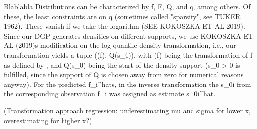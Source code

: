 Blablabla
Distributions can be characterized by f, F, Q, and q, among others. Of these, the least 
constraints are on q (sometimes called "sparsity", see TUKER 1962). These vanish if we
take the logarithm (SEE KOKOSZKA ET AL 2019). Since our DGP generates densities on
different supports, we use KOKOSZKA ET AL (2019)s modification on the log quantile-density
transformation, i.e., our transformation yields a tuple (\psi(f), Q(s_0)), with
\psi(f) being the transformation of f as defined by \citet{PetersenMüller2016}, and
Q(s_0) being the start of the density support (s_0 > 0 is fulfilled, since the support
of Q is chosen away from zero for numerical reasons anyway). For the predicted f_i^hats,
in the inverse transformation the s_0i from the corresponding observation f_i was
assigned as estimate s_0i^hat.

(Transformation approach regression: underestimating mu and sigma for lower x,
overestimating for higher x?)